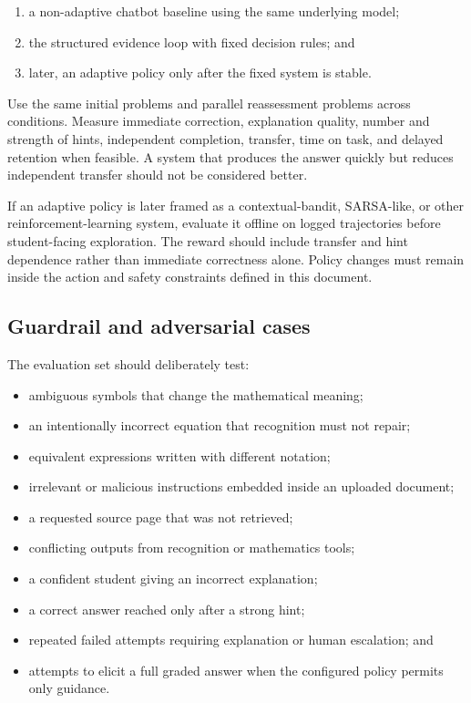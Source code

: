 \documentclass[11pt]{article}
\begin{document}
\begin{enumerate}
    \item a non-adaptive chatbot baseline using the same underlying model;
    \item the structured evidence loop with fixed decision rules; and
    \item later, an adaptive policy only after the fixed system is stable.
\end{enumerate}

Use the same initial problems and parallel reassessment problems across conditions. Measure immediate correction, explanation quality, number and strength of hints, independent completion, transfer, time on task, and delayed retention when feasible. A system that produces the answer quickly but reduces independent transfer should not be considered better.

If an adaptive policy is later framed as a contextual-bandit, SARSA-like, or other reinforcement-learning system, evaluate it offline on logged trajectories before student-facing exploration. The reward should include transfer and hint dependence rather than immediate correctness alone. Policy changes must remain inside the action and safety constraints defined in this document.

\subsection{Guardrail and adversarial cases}

The evaluation set should deliberately test:

\begin{itemize}
    \item ambiguous symbols that change the mathematical meaning;
    \item an intentionally incorrect equation that recognition must not repair;
    \item equivalent expressions written with different notation;
    \item irrelevant or malicious instructions embedded inside an uploaded document;
    \item a requested source page that was not retrieved;
    \item conflicting outputs from recognition or mathematics tools;
    \item a confident student giving an incorrect explanation;
    \item a correct answer reached only after a strong hint;
    \item repeated failed attempts requiring explanation or human escalation; and
    \item attempts to elicit a full graded answer when the configured policy permits only guidance.
\end{itemize}
\end{document}
